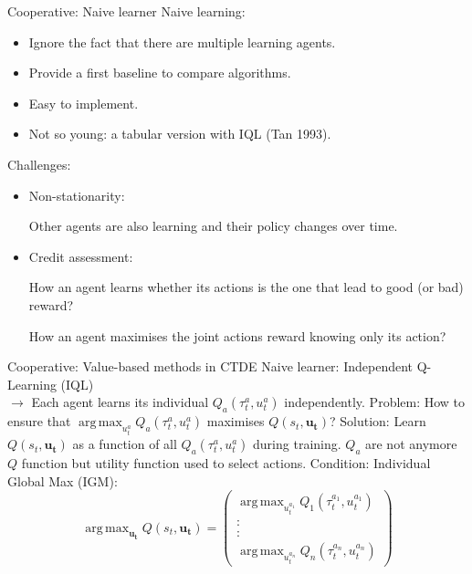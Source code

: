 \documentclass{beamer}
\DeclareMathOperator*{\argmaxA}{arg\,max}
\begin{document}
\begin{frame}{Cooperative: Naive learner}
Naive learning:
\begin{itemize}
    \item Ignore the fact that there are multiple learning agents.
    \item Provide a first baseline to compare algorithms.
    \item Easy to implement.
    \item Not so young: a tabular version with IQL (Tan 1993).
\end{itemize}
\vfill
Challenges:
\pause
\begin{itemize}
\item Non-stationarity:

Other agents are also learning and their policy changes over time.

\item Credit assessment: 

How an agent learns whether its actions is the one that lead to good (or bad) reward?

How an agent maximises the joint actions reward knowing only its action?

\end{itemize}
\end{frame}

\begin{frame}{Cooperative: Value-based methods in CTDE}
Naive learner: Independent Q-Learning (IQL)\\
$\rightarrow$ Each agent learns its individual $Q_a(\tau^a_t, u^a_t)$ independently.
\vfill
Problem:
How to ensure that $\argmaxA_{u^a_t} Q_a(\tau^a_t, u^a_t)$ maximises $Q(s_t, \bm{u_t})$?
\vfill
\pause
Solution: Learn $Q(s_t, \bm{u_t})$ as a function of all $Q_a(\tau^a_t, u^a_t)$ during training.
\vfill
$Q_a$ are not anymore $Q$ function but utility function used to select actions.
\vfill
Condition: Individual Global Max (IGM):
\begin{equation*}
    \argmaxA_{\bm{u_t}} Q(s_t, \bm{u_t}) = 
    \begin{pmatrix}
    \argmaxA_{u^{a_1}_t} Q_1(\tau^{a_1}_t, u^{a_1}_t) \\
    : \\
    : \\
    \argmaxA_{u^{a_n}_t} Q_n(\tau^{a_n}_t, u^{a_n}_t)
    \end{pmatrix}
\end{equation*}

\end{frame}
\end{document}
